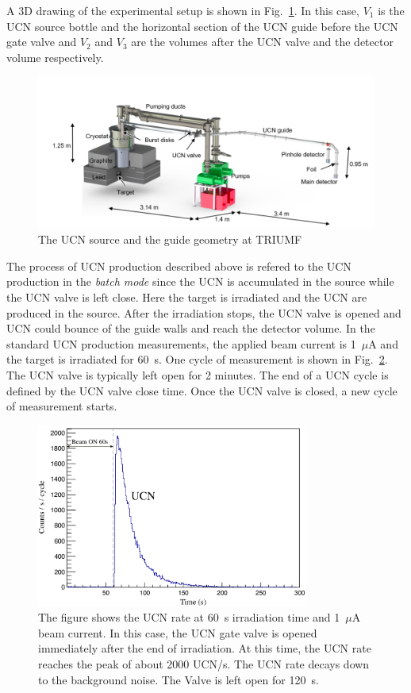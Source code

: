 A 3D drawing of the experimental setup is shown in
Fig.~\ref{fig:Source_all}. In this case, $V_1$ is the UCN source
bottle and the horizontal section of the UCN guide before the UCN gate
valve and $V_2$ and $V_3$ are the volumes after the UCN valve and the
detector volume respectively.

\begin{figure}[h!]
  \centering
  \includegraphics[width=1.1\textwidth]{Source_all.png}
  \caption{The UCN source and the guide geometry at TRIUMF }
  \label{fig:Source_all}
\end{figure}
The process of UCN production described above is refered to the UCN
production in the {\it {batch mode}} since the UCN is accumulated in
the source while the UCN valve is left close. Here the target is
irradiated and the UCN are produced in the source. After the
irradiation stops, the UCN valve is opened and UCN could bounce of the
guide walls and reach the detector volume. In the standard UCN
production measurements, the applied beam current is 1~$\mu$A and the
target is irradiated for 60~s. One cycle of measurement is shown in
Fig.~\ref{fig:UCNRate}. The UCN valve is typically left open for 2
minutes. The end of a UCN cycle is defined by the UCN valve close
time. Once the UCN valve is closed, a new cycle of measurement starts.


\begin{figure}[h!]
  \centering
  \includegraphics[width=0.8\textwidth]{UCNRate.png}
  \caption{The figure shows the UCN rate at 60~s irradiation time and
    1~$\mu$A beam current. In this case, the UCN gate valve is opened
    immediately after the end of irradiation. At this time, the UCN
    rate reaches the peak of about 2000 UCN/s. The UCN rate decays
    down to the background noise. The Valve is left open for 120~s. }
  \label{fig:UCNRate}
\end{figure}


